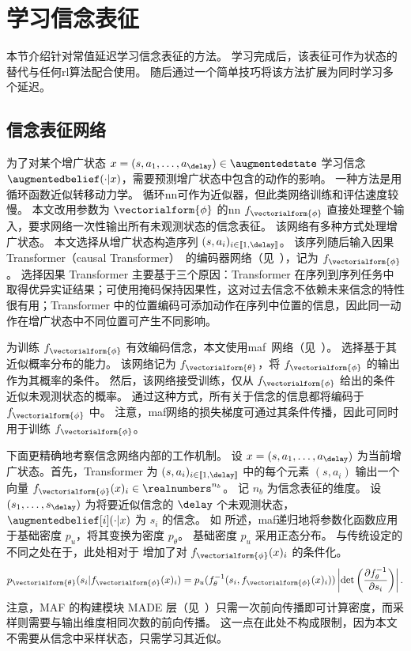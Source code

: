 \section{学习信念表征}

本节介绍针对常值延迟学习信念表征的方法。
学习完成后，该表征可作为状态的替代与任何\gls{rl}算法配合使用。
随后通过一个简单技巧将该方法扩展为同时学习多个延迟。

\subsection{信念表征网络}
\label{subsec:belief_net}

为了对某个增广状态 $x=(s,a_1,\dots,a_{\delay})\in\augmentedstate$ 学习信念 $\augmentedbelief(\cdot\vert x)$，需要预测增广状态中包含的动作的影响。
一种方法是用循环函数近似转移动力学。
循环\gls{nn}可作为近似器，但此类网络训练和评估速度较慢。
本文改用参数为 $\vectorialform{\phi}$ 的\gls{nn} $f_{\vectorialform{\phi}}$ 直接处理整个输入，要求网络一次性输出所有未观测状态的信念表征。
该网络有多种方式处理增广状态。
本文选择从增广状态构造序列 $(s,a_{i})_{i \in [\![1,\delay]\!]}$。
该序列随后输入因果 Transformer（causal Transformer）~\cite{vaswani2017attention}的编码器网络（见~），记为 $f_{\vectorialform{\phi}}$。
选择因果 Transformer 主要基于三个原因：Transformer 在序列到序列任务中取得优异实证结果\cite{devlin2018bert}；可使用掩码保持因果性，这对过去信念不依赖未来信念的特性很有用；Transformer 中的位置编码可添加动作在序列中位置的信息，因此同一动作在增广状态中不同位置可产生不同影响。

为训练 $f_{\vectorialform{\phi}}$ 有效编码信念，本文使用\gls{maf}~\cite{papamakarios2017masked}网络（见~）。
选择基于其近似概率分布的能力。
该网络记为 $f_{\vectorialform{\theta}}$，将 $f_{\vectorialform{\phi}}$ 的输出作为其概率的条件。
然后，该网络接受训练，仅从 $f_{\vectorialform{\phi}}$ 给出的条件近似未观测状态的概率。
通过这种方式，所有关于信念的信息都将编码于 $f_{\vectorialform{\phi}}$ 中。
注意，\gls{maf}网络的损失梯度可通过其条件传播，因此可同时用于训练 $f_{\vectorialform{\phi}}$。

下面更精确地考察信念网络内部的工作机制。
设 $x=(s,a_1,\dots,a_{\delay})$ 为当前增广状态。首先，Transformer 为 $(s,a_{i})_{i \in [\![1,\delay]\!]}$ 中的每个元素 $(s,a_{i})$ 输出一个向量 $f_{\vectorialform{\phi}}(x)_i\in\realnumbers^{n_b}$。
记 $n_b$ 为信念表征的维度。
设 $(s_1,\dots,s_{\delay})$ 为将要近似信念的 $\delay$ 个未观测状态，$\augmentedbelief[i](\cdot\vert x)$ 为 $s_i$ 的信念。
如  所述，\gls{maf}递归地将参数化函数应用于基础密度 $p_u$，将其变换为密度 $p_{\theta}$。
基础密度 $p_u$ 采用正态分布。
与传统设定的不同之处在于，此处相对于  增加了对 $f_{\vectorialform{\phi}}({x})_i$ 的条件化。
\begin{align*}
    p_{\vectorialform{\theta}}(s_i\vert f_{\vectorialform{\phi}}({x})_i) = p_u(f_\theta^{-1}(s_i,f_{\vectorialform{\phi}}({x})_i)) \left\lvert \det\left(\frac{\partial f_\theta^{-1}}{\partial s_i}\right)\right\rvert.
\end{align*}
注意，MAF 的构建模块 MADE 层（见~）只需一次前向传播即可计算密度，而采样则需要与输出维度相同次数的前向传播。
这一点在此处不构成限制，因为本文不需要从信念中采样状态，只需学习其近似。

